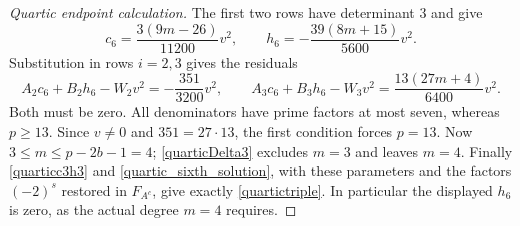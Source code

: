 \documentclass[12pt]{article}
\theoremstyle{remark}
\begin{document}
\begin{proof}[Quartic endpoint calculation]
The first two rows have determinant $3$ and give
\begin{equation}\label{quartic_sixth_solution}
 c_6=\frac{3(9m-26)}{11200}v^2,\qquad
 h_6=-\frac{39(8m+15)}{5600}v^2.
\end{equation}
Substitution in rows $i=2,3$ gives the residuals
\begin{equation}\label{quarticsix}
 A_2c_6+B_2h_6-W_2v^2=-\frac{351}{3200}v^2,
 \qquad
 A_3c_6+B_3h_6-W_3v^2=\frac{13(27m+4)}{6400}v^2.
\end{equation}
Both must be zero.  All denominators have prime factors at most seven,
whereas $p\ge13$.  Since $v\ne0$ and $351=27\cdot13$, the first
condition forces $p=13$.  Now $3\le m\le p-2b-1=4$;
\eqref{quarticDelta3} excludes $m=3$ and leaves $m=4$.
Finally \eqref{quarticc3h3} and \eqref{quartic_sixth_solution}, with
these parameters and the factors $(-2)^s$ restored in $F_{A^c}$,
give exactly \eqref{quartictriple}.  In particular the displayed
$h_6$ is zero, as the actual degree $m=4$ requires.
\end{proof}
\end{document}
